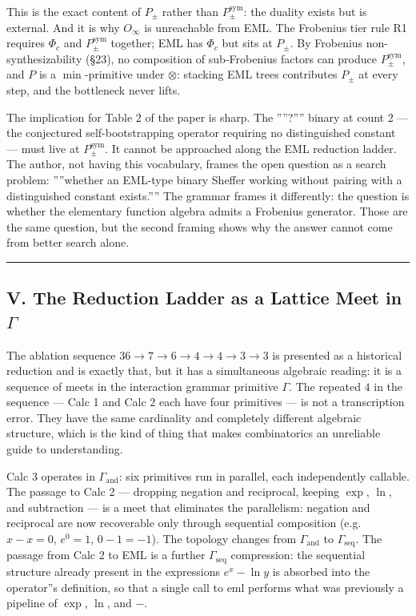 \documentclass[12pt,a4paper]{article}
\newcommand{\pilcrow}{\S}
\begin{document}
This is the exact content of $P_{\pm}$ rather than $P_{\pm}^{\text{sym}}$: the
duality exists but is external. And it is why $O_{\infty}$ is unreachable from
EML. The Frobenius tier rule R1 requires $\Phi_c$ and $P_{\pm}^{\text{sym}}$
together; EML has $\Phi_c$ but sits at $P_{\pm}$. By Frobenius non-synthesizability
(\pilcrow{}23), no composition of sub-Frobenius factors can produce $P_{\pm}^{\text{sym}}$,
and $P$ is a $\min$-primitive under $\otimes$: stacking EML trees contributes
$P_{\pm}$ at every step, and the bottleneck never lifts.

The implication for Table 2 of the paper is sharp. The ''''?'''' binary at count 2 ---
the conjectured self-bootstrapping operator requiring no distinguished constant ---
must live at $P_{\pm}^{\text{sym}}$. It cannot be approached along the EML
reduction ladder. The author, not having this vocabulary, frames the open question
as a search problem: ''''whether an EML-type binary Sheffer working without pairing
with a distinguished constant exists.'''' The grammar frames it differently: the
question is whether the elementary function algebra admits a Frobenius generator.
Those are the same question, but the second framing shows why the answer cannot
come from better search alone.

\begin{center}
\rule{0.5\textwidth}{0.4pt}
\end{center}

\subsection{V. The Reduction Ladder as a Lattice Meet in $\Gamma$}

The ablation sequence $36 \to 7 \to 6 \to 4 \to 4 \to 3 \to 3$ is presented as
a historical reduction and is exactly that, but it has a simultaneous algebraic
reading: it is a sequence of meets in the interaction grammar primitive $\Gamma$.
The repeated $4$ in the sequence --- Calc 1 and Calc 2 each have four primitives ---
is not a transcription error. They have the same cardinality and completely
different algebraic structure, which is the kind of thing that makes combinatorics
an unreliable guide to understanding.

Calc 3 operates in $\Gamma_\text{and}$: six primitives run in parallel, each
independently callable. The passage to Calc 2 --- dropping negation and reciprocal,
keeping $\exp$, $\ln$, and subtraction --- is a meet that eliminates the
parallelism: negation and reciprocal are now recoverable only through sequential
composition (e.g. $x - x = 0$, $e^0 = 1$, $0 - 1 = -1$). The topology changes
from $\Gamma_\text{and}$ to $\Gamma_\text{seq}$. The passage from Calc 2 to EML
is a further $\Gamma_\text{seq}$ compression: the sequential structure already
present in the expressions $e^x - \ln y$ is absorbed into the operator''s
definition, so that a single call to $\text{eml}$ performs what was previously a
pipeline of $\exp$, $\ln$, and $-$.
\end{document}
